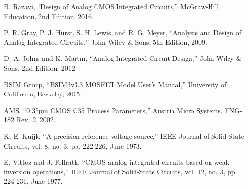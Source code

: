 \documentclass[12pt,a4paper]{article}
\begin{document}
{}
\begin{thebibliography}{99}
     B. Razavi, ``Design of Analog CMOS Integrated Circuits,'' McGraw-Hill Education, 2nd Edition, 2016.
    
     P. R. Gray, P. J. Hurst, S. H. Lewis, and R. G. Meyer, ``Analysis and Design of Analog Integrated Circuits,'' John Wiley \& Sons, 5th Edition, 2009.
    
     D. A. Johns and K. Martin, ``Analog Integrated Circuit Design,'' John Wiley \& Sons, 2nd Edition, 2012.
    
     BSIM Group, ``BSIM3v3.3 MOSFET Model User's Manual,'' University of California, Berkeley, 2005.
    
     AMS, ``0.35µm CMOS C35 Process Parameters,'' Austria Micro Systems, ENG-182 Rev. 2, 2002.
    
     K. E. Kuijk, ``A precision reference voltage source,'' IEEE Journal of Solid-State Circuits, vol. 8, no. 3, pp. 222-226, June 1973.
    
     E. Vittoz and J. Fellrath, ``CMOS analog integrated circuits based on weak inversion operations,'' IEEE Journal of Solid-State Circuits, vol. 12, no. 3, pp. 224-231, June 1977.
\end{thebibliography}
\end{document}
